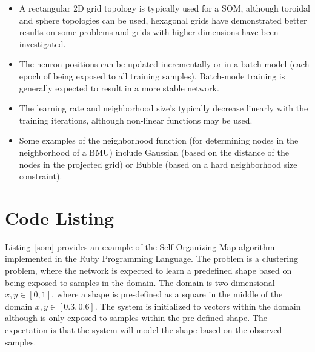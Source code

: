 \documentclass[a4paper, 11pt]{article}
\begin{document}
\begin{itemize}
	\item A rectangular 2D grid topology is typically used for a SOM, although toroidal and sphere topologies can be used, hexagonal grids have demonstrated better results on some problems and grids with higher dimensions have been investigated. 
	\item The neuron positions can be updated incrementally or in a batch model (each epoch of being exposed to all training samples). Batch-mode training is generally expected to result in a more stable network.
	\item The learning rate and neighborhood size's typically decrease linearly with the training iterations, although non-linear functions may be used.
	\item Some examples of the neighborhood function (for determining nodes in the neighborhood of a BMU) include Gaussian (based on the distance of the nodes in the projected grid) or Bubble (based on a hard neighborhood size constraint).
\end{itemize}

\section{Code Listing}
\label{sec:code}
Listing~\ref{som} provides an example of the Self-Organizing Map algorithm implemented in the Ruby Programming Language. 
The problem is a clustering problem, where the network is expected to learn a predefined shape based on being exposed to samples in the domain. The domain is two-dimensional $x,y \in [0,1]$, where a shape is pre-defined as a square in the middle of the domain $x,y \in [0.3,0.6]$. The system is initialized to vectors within the domain although is only exposed to samples within the pre-defined shape. The expectation is that the system will model the shape based on the observed samples.
\end{document}
